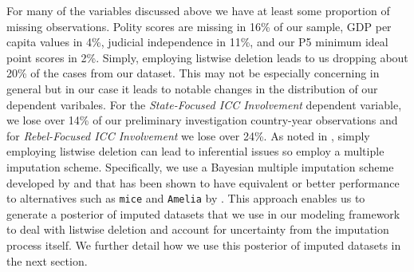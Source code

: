 For many of the variables discussed above we have at least some proportion of missing observations. Polity scores are missing in 16\% of our sample, GDP per capita values in 4\%, judicial independence in 11\%, and our P5 minimum ideal point scores in 2\%. Simply, employing listwise deletion leads to us dropping about 20\% of the cases from our dataset. This may not be especially concerning in general but in our case it leads to notable changes in the distribution of our dependent varibales. For the \emph{State-Focused ICC Involvement} dependent variable, we lose over 14\% of our preliminary investigation country-year observations and for \emph{Rebel-Focused ICC Involvement} we lose over 24\%. As noted in \citet{honaker:king:2010}, simply employing listwise deletion can lead to inferential issues so employ a multiple imputation scheme. Specifically, we use a Bayesian multiple imputation scheme developed by \citet{hoff:2007} and that has been shown to have equivalent or better performance to alternatives such as \texttt{mice} and \texttt{Amelia} by \citet{hollenbach:etal:2018}. This approach enables us to generate a posterior of imputed datasets that we use in our modeling framework to deal with listwise deletion and account for uncertainty from the imputation process itself. We further detail how we use this posterior of imputed datasets in the next section.
